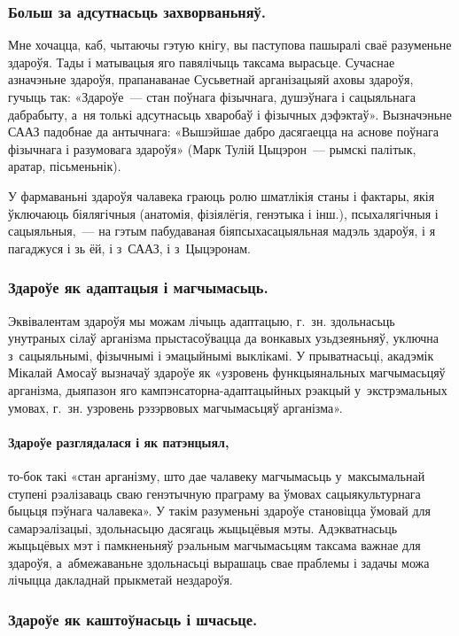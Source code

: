\subsubsection{Больш за адсутнасьць захворваньняў.} 

Мне хочацца, каб, чытаючы гэтую кнігу, вы паступова пашыралі сваё разуменьне здароўя. Тады і матывацыя яго павялічыць таксама вырасьце. Сучаснае азначэньне здароўя, прапанаванае Сусьветнай арганізацыяй аховы здароўя, гучыць так: «Здароўе~--- стан поўнага фізычнага, душэўнага і сацыяльнага дабрабыту, а~ня толькі адсутнасьць хваробаў і фізычных дэфэктаў». Вызначэньне СААЗ падобнае да антычнага: «Вышэйшае дабро дасягаецца на аснове поўнага фізычнага і разумовага здароўя» (Марк Тулій Цыцэрон~--- рымскі палітык, аратар, пісьменьнік).

У фармаваньні здароўя чалавека граюць ролю шматлікія станы і фактары, якія ўключаюць біялягічныя (анатомія, фізіялёгія, генэтыка і інш.), псыхалягічныя і сацыяльныя,~--- на гэтым пабудаваная біяпсыхасацыяльная мадэль здароўя, і я пагаджуся і зь ёй, і з~СААЗ, і з~Цыцэронам.


\subsubsection{Здароўе як адаптацыя і магчымасьць.}

Эквівалентам здароўя мы можам лічыць адаптацыю, г.~зн. здольнасьць унутраных сілаў арганізма прыстасоўвацца да вонкавых узьдзеяньняў, уключна з~сацыяльнымі, фізычнымі і эмацыйнымі выклікамі. У прыватнасьці, акадэмік Мікалай Амосаў вызначаў здароўе як «узровень функцыянальных магчымасьцяў арганізма, дыяпазон яго кампэнсаторна-адаптацыйных рэакцый у~экстрэмальных умовах, г.~зн. узровень рэзэрвовых магчымасьцяў арганізма».

\paragraph{Здароўе разглядалася і як патэнцыял,} то-бок такі «стан арганізму, што дае чалавеку магчымасьць у~максымальнай ступені рэалізаваць сваю генэтычную праграму ва ўмовах сацыякультурнага быцьця пэўнага чалавека». У такім разуменьні здароўе становіцца ўмовай для самарэалізацыі, здольнасьцю дасягаць жыцьцёвыя мэты. Адэкватнасьць жыцьцёвых мэт і памкненьняў рэальным магчымасьцям таксама важнае для здароўя, а~абмежаваньне здольнасьці вырашаць свае праблемы і задачы можа лічыцца дакладнай прыкметай нездароўя.

\subsubsection{Здароўе як каштоўнасьць і шчасьце.}

